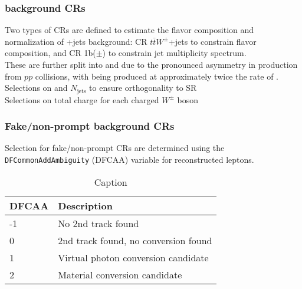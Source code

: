 \documentclass[../thesis.tex]{subfiles}
\begin{document}
\subsubsection*{\ttW background CRs}
Two types of CRs are defined to estimate the flavor composition and normalization of \ttW +jets background: CR $t\bar{t}W^\pm$+jets to constrain flavor composition, and CR 1b($\pm$) to constrain jet multiplicity spectrum.\\
These are further split into \CRttWpm and \CRonebpm due to the pronounced asymmetry in \ttW production from $pp$ collisions, with \ttWplus being produced at approximately twice the rate of \ttWminus.
Selections on \HT and $N_\mathrm{jets}$ to ensure orthogonality to SR\\
Selections on total charge for each charged $W^\pm$ boson\\

\subsubsection*{Fake/non-prompt background CRs}
Selection for fake/non-prompt CRs are determined using the \verb|DFCommonAddAmbiguity| (DFCAA) variable for reconstructed leptons.

\begin{table}[!ht]
\centering
\caption{\label{tab:ana:DFCAA}Caption}%
\begin{tabular}{p{2cm}|l}
\toprule\toprule
DFCAA & Description \\
\midrule
-1			& No 2nd track found \\
0			& 2nd track found, no conversion found \\
1			& Virtual photon conversion candidate \\
2			& Material conversion candidate\\
\bottomrule\bottomrule
\end{tabular}
\end{table}
\end{document}
